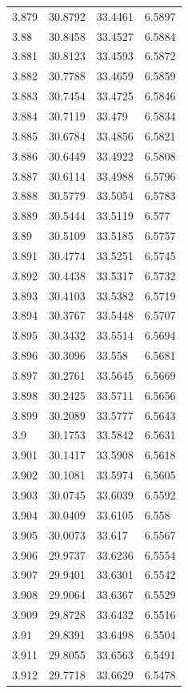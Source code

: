 \begin{tabular}{llll}
3.879 & 30.8792 & 33.4461 & 6.5897 \\
3.88 & 30.8458 & 33.4527 & 6.5884 \\
3.881 & 30.8123 & 33.4593 & 6.5872 \\
3.882 & 30.7788 & 33.4659 & 6.5859 \\
3.883 & 30.7454 & 33.4725 & 6.5846 \\
3.884 & 30.7119 & 33.479 & 6.5834 \\
3.885 & 30.6784 & 33.4856 & 6.5821 \\
3.886 & 30.6449 & 33.4922 & 6.5808 \\
3.887 & 30.6114 & 33.4988 & 6.5796 \\
3.888 & 30.5779 & 33.5054 & 6.5783 \\
3.889 & 30.5444 & 33.5119 & 6.577 \\
3.89 & 30.5109 & 33.5185 & 6.5757 \\
3.891 & 30.4774 & 33.5251 & 6.5745 \\
3.892 & 30.4438 & 33.5317 & 6.5732 \\
3.893 & 30.4103 & 33.5382 & 6.5719 \\
3.894 & 30.3767 & 33.5448 & 6.5707 \\
3.895 & 30.3432 & 33.5514 & 6.5694 \\
3.896 & 30.3096 & 33.558 & 6.5681 \\
3.897 & 30.2761 & 33.5645 & 6.5669 \\
3.898 & 30.2425 & 33.5711 & 6.5656 \\
3.899 & 30.2089 & 33.5777 & 6.5643 \\
3.9 & 30.1753 & 33.5842 & 6.5631 \\
3.901 & 30.1417 & 33.5908 & 6.5618 \\
3.902 & 30.1081 & 33.5974 & 6.5605 \\
3.903 & 30.0745 & 33.6039 & 6.5592 \\
3.904 & 30.0409 & 33.6105 & 6.558 \\
3.905 & 30.0073 & 33.617 & 6.5567 \\
3.906 & 29.9737 & 33.6236 & 6.5554 \\
3.907 & 29.9401 & 33.6301 & 6.5542 \\
3.908 & 29.9064 & 33.6367 & 6.5529 \\
3.909 & 29.8728 & 33.6432 & 6.5516 \\
3.91 & 29.8391 & 33.6498 & 6.5504 \\
3.911 & 29.8055 & 33.6563 & 6.5491 \\
3.912 & 29.7718 & 33.6629 & 6.5478 \\

\end{tabular}
